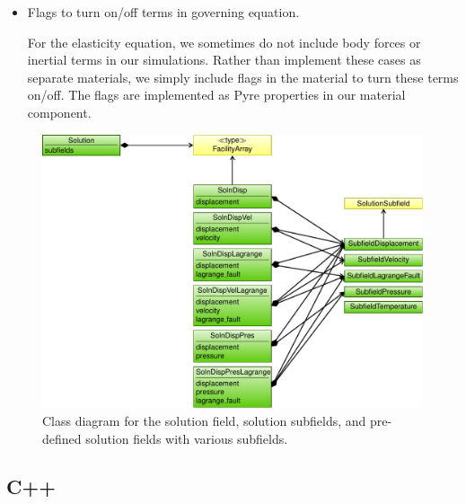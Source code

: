 \begin{itemize}
\item Flags to turn on/off terms in governing equation.

  For the elasticity equation, we sometimes do not include body forces
  or inertial terms in our simulations. Rather than implement these
  cases as separate materials, we simply include flags in the material
  to turn these terms on/off. The flags are implemented as Pyre
  properties in our material component.
\end{itemize}

\begin{figure}[htbp]
  \includegraphics[scale=0.8]{developer/figs/solution_classdiagram}
  \caption{Class diagram for the solution field, solution subfields, and pre-defined solution fields with various subfields.}
  \label{fig:developer:solution:class}
\end{figure}

\subsection{C++}



